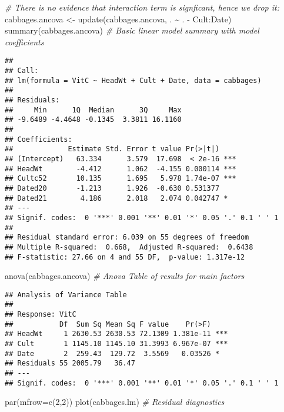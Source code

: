 \documentclass[
]{article}
\newenvironment{Shaded}{\begin{snugshade}}{\end{snugshade}}
\newcommand{\AttributeTok}[1]{\textcolor[rgb]{0.77,0.63,0.00}{#1}}
\newcommand{\CommentTok}[1]{\textcolor[rgb]{0.56,0.35,0.01}{\textit{#1}}}
\newcommand{\DecValTok}[1]{\textcolor[rgb]{0.00,0.00,0.81}{#1}}
\newcommand{\FunctionTok}[1]{\textcolor[rgb]{0.00,0.00,0.00}{#1}}
\newcommand{\NormalTok}[1]{#1}
\newcommand{\OtherTok}[1]{\textcolor[rgb]{0.56,0.35,0.01}{#1}}
\newcommand{\SpecialCharTok}[1]{\textcolor[rgb]{0.00,0.00,0.00}{#1}}
\begin{document}
\begin{Shaded}
\begin{Highlighting}[]
\CommentTok{\# There is no evidence that interaction term is signficant, hence we drop it:}
\NormalTok{cabbages.ancova }\OtherTok{\textless{}{-}} \FunctionTok{update}\NormalTok{(cabbages.ancova, . }\SpecialCharTok{\textasciitilde{}}\NormalTok{ . }\SpecialCharTok{{-}}\NormalTok{ Cult}\SpecialCharTok{:}\NormalTok{Date)}
\FunctionTok{summary}\NormalTok{(cabbages.ancova)  }\CommentTok{\# Basic linear model summary with model coefficients}
\end{Highlighting}
\end{Shaded}

\begin{verbatim}
## 
## Call:
## lm(formula = VitC ~ HeadWt + Cult + Date, data = cabbages)
## 
## Residuals:
##     Min      1Q  Median      3Q     Max 
## -9.6489 -4.4648 -0.1345  3.3811 16.1160 
## 
## Coefficients:
##             Estimate Std. Error t value Pr(>|t|)    
## (Intercept)   63.334      3.579  17.698  < 2e-16 ***
## HeadWt        -4.412      1.062  -4.155 0.000114 ***
## Cultc52       10.135      1.695   5.978 1.74e-07 ***
## Dated20       -1.213      1.926  -0.630 0.531377    
## Dated21        4.186      2.018   2.074 0.042747 *  
## ---
## Signif. codes:  0 '***' 0.001 '**' 0.01 '*' 0.05 '.' 0.1 ' ' 1
## 
## Residual standard error: 6.039 on 55 degrees of freedom
## Multiple R-squared:  0.668,  Adjusted R-squared:  0.6438 
## F-statistic: 27.66 on 4 and 55 DF,  p-value: 1.317e-12
\end{verbatim}

\begin{Shaded}
\begin{Highlighting}[]
\FunctionTok{anova}\NormalTok{(cabbages.ancova)    }\CommentTok{\# Anova Table of results for main factors}
\end{Highlighting}
\end{Shaded}

\begin{verbatim}
## Analysis of Variance Table
## 
## Response: VitC
##           Df  Sum Sq Mean Sq F value    Pr(>F)    
## HeadWt     1 2630.53 2630.53 72.1309 1.381e-11 ***
## Cult       1 1145.10 1145.10 31.3993 6.967e-07 ***
## Date       2  259.43  129.72  3.5569   0.03526 *  
## Residuals 55 2005.79   36.47                      
## ---
## Signif. codes:  0 '***' 0.001 '**' 0.01 '*' 0.05 '.' 0.1 ' ' 1
\end{verbatim}

\begin{Shaded}
\begin{Highlighting}[]
\FunctionTok{par}\NormalTok{(}\AttributeTok{mfrow=}\FunctionTok{c}\NormalTok{(}\DecValTok{2}\NormalTok{,}\DecValTok{2}\NormalTok{))}
\FunctionTok{plot}\NormalTok{(cabbages.lm) }\CommentTok{\# Residual diagnostics}
\end{Highlighting}
\end{Shaded}
\end{document}
